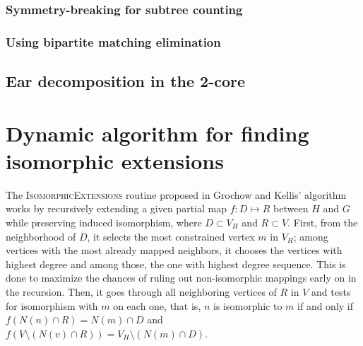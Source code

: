 \documentclass{article}
\begin{document}
\subsubsection{Symmetry-breaking for subtree counting}
   

\subsubsection{Using bipartite matching elimination}


\subsection{Ear decomposition in the 2-core}

\section{Dynamic algorithm for finding isomorphic extensions}
The I\textsc{somorphic}E\textsc{xtensions} routine proposed in Grochow and Kellis' algorithm works by recursively extending a given partial map $f:D \mapsto R$ between $H$ and $G$ while preserving induced isomorphism, where $D \subset V_H$ and $R \subset V$. First, from the neighborhood of $D$, it selects the most constrained vertex $m$ in $V_H$; among vertices with the most already mapped neighbors, it chooses the vertices with highest degree and among those, the one with highest degree sequence. This is done to maximize the chances of ruling out non-isomorphic mappings early on in the recursion. Then, it  goes through all neighboring vertices of $R$ in $V$ and tests for isomorphism with $m$ on each one, that is, $n$ is isomorphic to $m$ if and only if $f(N(n) \cap R) = N(m) \cap D$ and $f(V \setminus (N(v) \cap R)) = V_H \setminus (N(m) \cap D)$.
\end{document}
